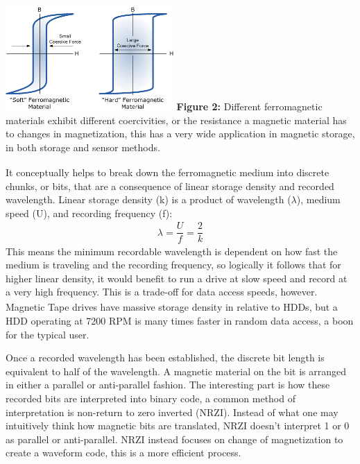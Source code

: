 \documentclass[11pt]{article}
\begin{document}
\begin{multicols}{2}
\begin{center}
	\centering
	\includegraphics[width=0.48\textwidth]{mag_hysterisis.png}
	{\footnotesize\textbf{Figure 2:} Different ferromagnetic materials exhibit different coercivities, or the resistance a magnetic material has to changes in magnetization, this has a very wide application in magnetic storage, in both storage and sensor methods.\textsubscript{\cite{label7}}}
\end{center} 

It conceptually helps to break down the ferromagnetic medium into discrete chunks, or bits, that are a consequence of linear storage density and recorded wavelength. Linear storage density (k) is a product of wavelength ($\lambda$), medium speed (U), and recording frequency (f):
\begin{align*}
	\lambda= \dfrac{U}{f} = \dfrac{2}{k}
\end{align*}
This means the minimum recordable wavelength is dependent on how fast the medium is traveling and the recording frequency, so logically it follows that for higher linear density, it would benefit to run a drive at slow speed and record at a very high frequency. This is a trade-off for data access speeds, however\textsubscript{\cite{label1}}. Magnetic Tape drives have massive storage density in relative to HDDs, but a HDD operating at 7200 RPM is many times faster in random data access, a boon for the typical user. 

Once a recorded wavelength has been established, the discrete bit length is equivalent to half of the wavelength. A magnetic material on the bit is arranged in either a parallel or anti-parallel fashion. The interesting part is how these recorded bits are interpreted into binary code, a common method of interpretation is non-return to zero inverted (NRZI). Instead of what one may intuitively think how magnetic bits are translated, NRZI doesn't interpret 1 or 0 as parallel or anti-parallel. NRZI instead focuses on change of magnetization to create a waveform code, this is a more efficient process\textsubscript{\cite{label1}}. 


\end{multicols}
\end{document}
